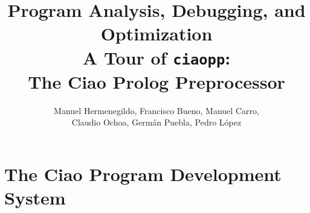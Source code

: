 \documentclass{article}
\newcommand{\Blue}{}
\renewcommand{\_}{\char'137}
\begin{document}
\title{Program Analysis, Debugging, and Optimization\\
\huge{\Blue{A Tour of {\tt ciaopp}:\\ 
     The Ciao Prolog Preprocessor}}
}

\author{
Manuel Hermenegildo, 
Francisco Bueno, 
Manuel Carro, \\
Claudio Ochoa,
Germ\'{a}n Puebla, 
Pedro L\'{o}pez
}

\maketitle

\section{The Ciao Program Development System}
\end{document}
